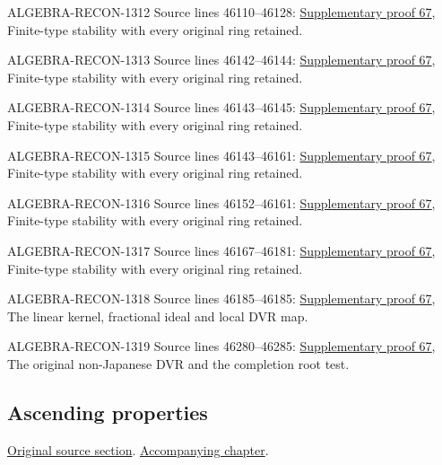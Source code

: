 \begin{AlgebraSourceRoutes}
\item[ALGEBRA-RECON-1312] Source lines 46110--46128: \hyperlink{algebra_nagata_notes_20260929}{Supplementary proof 67}, Finite-type stability with every original ring retained.
\item[ALGEBRA-RECON-1313] Source lines 46142--46144: \hyperlink{algebra_nagata_notes_20260929}{Supplementary proof 67}, Finite-type stability with every original ring retained.
\item[ALGEBRA-RECON-1314] Source lines 46143--46145: \hyperlink{algebra_nagata_notes_20260929}{Supplementary proof 67}, Finite-type stability with every original ring retained.
\item[ALGEBRA-RECON-1315] Source lines 46143--46161: \hyperlink{algebra_nagata_notes_20260929}{Supplementary proof 67}, Finite-type stability with every original ring retained.
\item[ALGEBRA-RECON-1316] Source lines 46152--46161: \hyperlink{algebra_nagata_notes_20260929}{Supplementary proof 67}, Finite-type stability with every original ring retained.
\item[ALGEBRA-RECON-1317] Source lines 46167--46181: \hyperlink{algebra_nagata_notes_20260929}{Supplementary proof 67}, Finite-type stability with every original ring retained.
\item[ALGEBRA-RECON-1318] Source lines 46185--46185: \hyperlink{algebra_nagata_notes_20260929}{Supplementary proof 67}, The linear kernel, fractional ideal and local DVR map.
\item[ALGEBRA-RECON-1319] Source lines 46280--46285: \hyperlink{algebra_nagata_notes_20260929}{Supplementary proof 67}, The original non-Japanese DVR and the completion root test.
\end{AlgebraSourceRoutes}

\subsection{Ascending properties}
\hypertarget{algebra-source-section-ascending-properties}{}
\noindent\href{https://github.com/stacks/stacks-project/blob/a04446e57ec1fbc252a871afcec7752fb2807b14/algebra.tex\#L46293}{Original source section}. \href{algebra.pdf\#nameddest=section-ascending-properties}{Accompanying chapter}.

